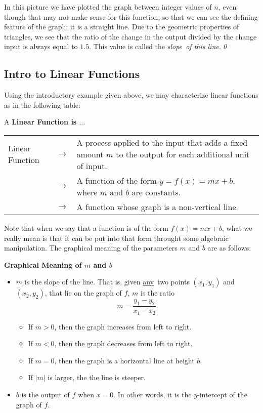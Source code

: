 \begin{eg}
In this picture we have plotted the graph between integer values of $n$, even though that may not make sense for this function, so that we can see the defining feature of the graph; it is a straight line. Due to the geometric properties of triangles, we see that the ratio of the change in the output divided by the change input is always equal to $1.5$. This value is called the \it{slope}\ \normalfont of this line.\qed \end{eg} 


\subsection{Intro to Linear Functions}

Using the introductory example given above, we may characterize linear functions as in the following table:\\

\begin{center}
A {\bf Linear Function is $\ldots$}
\begin{tabular}{|p{1.5in} c p{2in}|}
\hline Linear Function & $\longrightarrow$ & A process applied to the input that adds a fixed amount $m$ to the output for each additional unit of input.\\
\ & $\longrightarrow$ & A function of the form $y = f(x) = mx+b$, where $m$ and $b$ are constants.\\
\ & $\longrightarrow$ & A function whose graph is a non-vertical line. \\
\hline
\end{tabular}
\end{center}

Note that when we say that a function is of the form $f(x) = mx+b$, what we really mean is that it can be put into that form throught some algebraic manipulation. The graphical meaning of the parameters $m$ and $b$ are as follows:

\begin{tcolorbox}
{\bf Graphical Meaning of $m$ and $b$}\\
\begin{itemize}
\item $m$ is the slope of the line. That is, given \underline{any}\ \normalfont two points $(x_1,y_1)$ and $(x_2,y_2)$, that lie on the graph of $f$, $m$ is the ratio
\[
m = \frac{y_1-y_2}{x_1-x_2}.
\]
\begin{itemize}
\item If $m>0$, then the graph increases from left to right.
\item If $m<0$, then the graph decreases from left to right.
\item If $m=0$, then the graph is a horizontal line at height $b$.
\item If $|m|$ is larger, the the line is steeper.
\end{itemize}
\item $b$ is the output of $f$ when $x=0$. In other words, it is the $y$-intercept of the graph of $f$.
\end{itemize}
\end{tcolorbox}

